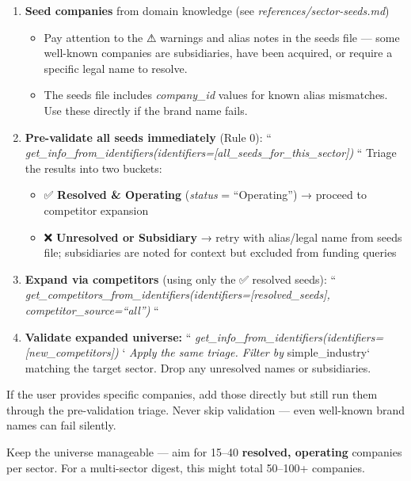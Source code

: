 \documentclass[11pt]{article}
\begin{document}
\begin{enumerate}[leftmargin=*,itemsep=2pt,topsep=2pt]
\item {} \textbf{Seed companies} from domain knowledge (see \emph{references/sector-seeds.md})
\begin{itemize}[leftmargin=*,itemsep=2pt,topsep=2pt]
\item {} Pay attention to the ⚠ warnings and alias notes in the seeds file — some well-known companies are subsidiaries, have been acquired, or require a specific legal name to resolve.
\item {} The seeds file includes \emph{company\_\allowbreak{}id} values for known alias mismatches. Use these directly if the brand name fails.
\end{itemize}
\item {} \textbf{Pre-validate all seeds immediately} (Rule 0): ``\emph{ get\_\allowbreak{}info\_\allowbreak{}from\_\allowbreak{}identifiers(identifiers=[all\_\allowbreak{}seeds\_\allowbreak{}for\_\allowbreak{}this\_\allowbreak{}sector]) }`` Triage the results into two buckets:
\begin{itemize}[leftmargin=*,itemsep=2pt,topsep=2pt]
\item {} ✅ \textbf{Resolved \& Operating} (\emph{status} = ``Operating'') → proceed to competitor expansion
\item {} ❌ \textbf{Unresolved or Subsidiary} → retry with alias/legal name from seeds file; subsidiaries are noted for context but excluded from funding queries
\end{itemize}
\item {} \textbf{Expand via competitors} (using only the ✅ resolved seeds): ``\emph{ get\_\allowbreak{}competitors\_\allowbreak{}from\_\allowbreak{}identifiers(identifiers=[resolved\_\allowbreak{}seeds], competitor\_\allowbreak{}source=``all'') }``
\item {} \textbf{Validate expanded universe:} ``\emph{ get\_\allowbreak{}info\_\allowbreak{}from\_\allowbreak{}identifiers(identifiers=[new\_\allowbreak{}competitors]) }`\emph{ Apply the same triage. Filter by }simple\_\allowbreak{}industry` matching the target sector. Drop any unresolved names or subsidiaries.
\end{enumerate}

If the user provides specific companies, add those directly but still run them through the pre-validation triage. Never skip validation — even well-known brand names can fail silently.


Keep the universe manageable — aim for 15–40 \textbf{resolved, operating} companies per sector. For a multi-sector digest, this might total 50–100+ companies.
\end{document}
